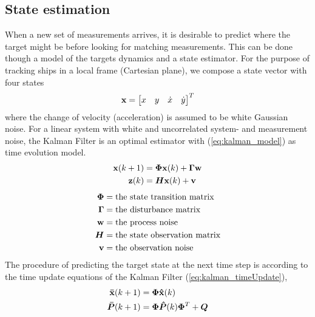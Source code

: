 \subsection{State estimation} %
When a new set of \glspl{measurement} arrives, it is desirable to predict where the target might be before looking for matching measurements. This can be done though a model of the targets dynamics and a state estimator. For the purpose of tracking ships in a local frame (Cartesian plane), we compose a state vector with four states
\begin{equation}
\boldsymbol{\mathbf{x}} = \begin{bmatrix}
x & y & \dot{x} & \dot{y}
\end{bmatrix}^T
\label{eq:state_vector}
\end{equation}
where the change of velocity (acceleration) is assumed to be white Gaussian noise. For a linear system with white and uncorrelated system- and measurement noise, the Kalman Filter is an optimal estimator with (\ref{eq:kalman_model}) as time evolution model.
\begin{equation}
\begin{split}
\boldsymbol{\mathbf{x}}(k+1) &= \bm{\Phi} \boldsymbol{\mathbf{x}}(k) + \bm{\Gamma} \boldsymbol{\mathbf{w}} \\
\boldsymbol{\mathbf{z}}(k) &= \bm{H} \boldsymbol{\mathbf{x}}(k) + \boldsymbol{\mathbf{v}}
\end{split}
\label{eq:kalman_model}
\end{equation}
\begin{equation}
\begin{split}
\bm{\Phi} 	&= \text{the state transition matrix} \\
\bm{\Gamma}	&= \text{the disturbance matrix} \\
\boldsymbol{\mathbf{w}}		&= \text{the process noise} \\
\bm{H} 		&= \text{the state observation matrix} \\
\boldsymbol{\mathbf{v}} 		&= \text{the observation noise} \\
\end{split}
\end{equation}
The procedure of predicting the target state at the next time step is according to the time update equations of the Kalman Filter (\ref{eq:kalman_timeUpdate}),
\begin{equation}
\begin{split}
\boldsymbol{\mathbf{\bar{x}}}(k+1) 	&= \bm{\Phi} \boldsymbol{\mathbf{\hat{x}}}(k) \\
\bm{\bar{P}}(k+1)	&= \bm{\Phi} \bm{\hat{P}}(k)  \bm{\Phi}^T + \bm{Q} \\
\end{split}
\label{eq:kalman_timeUpdate}
\end{equation}

